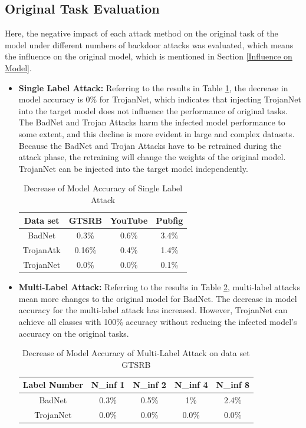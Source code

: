 \documentclass[english,version-2022-01]{uzl-thesis}
\begin{document}
\subsection{Original Task Evaluation} Here, the negative impact of each attack method on the original task of the model under different numbers of backdoor attacks was evaluated, which means the influence on the original model, which is mentioned in Section \ref{Influence on Model}.
\begin{itemize}
    \item \textbf{Single Label Attack:} Referring to the results in Table \ref{Decrease of Model Accuracy of Single Label Attack}, the decrease in model accuracy is 0\% for TrojanNet, which indicates that injecting TrojanNet into the target model does not influence the performance of original tasks. The BadNet and Trojan Attacks harm the infected model performance to some extent, and this decline is more evident in large and complex datasets. Because the BadNet and Trojan Attacks have to be retrained during the attack phase, the retraining will change the weights of the original model. TrojanNet can be injected into the target model independently.
    \begin{table}[htbp]
    \centering
    \caption{Decrease of Model Accuracy of Single Label Attack\cite{tang2020embarrassingly}}
    \begin{tabular}{|c|c|c|c|}
     \hline Data set  &  GTSRB  & YouTube &  Pubfig  \\
    \hline BadNet    & 0.3\%  & 0.6\%  &  3.4\%     \\
    \hline TrojanAtk & 0.16\%   & 0.4\% &  1.4\%    \\
    \hline TrojanNet & 0.0\%   & 0.0\%   &  0.1\%   \\
    \hline 
    \end{tabular}
    \label{Decrease of Model Accuracy of Single Label Attack}
    \end{table}
    \item \textbf{Multi-Label Attack:} Referring to the results in Table \ref{Decrease of Model Accuracy of Multi-Label Attack on data set GTSRB}, multi-label attacks mean more changes to the original model for BadNet. The decrease in model accuracy for the multi-label attack has increased. However, TrojanNet can achieve all classes with 100\% accuracy without reducing the infected model's accuracy on the original tasks.
    \begin{table}[htbp]
    \centering
    \caption{Decrease of Model Accuracy of Multi-Label Attack on data set GTSRB\cite{tang2020embarrassingly}}
    \begin{tabular}{|c|c|c|c|c|}
    \hline Label Number  &  N_{inf} \= 1  & N_{inf} \= 2 &  N_{inf} \= 4 & N_{inf} \= 8  \\
    \hline BadNet        &  0.3\%         & 0.5\%        &  1\%          & 2.4\%         \\
    \hline TrojanNet     &  0.0\%         & 0.0\%        &  0.0\%        & 0.0\%         \\
    \hline 
    \end{tabular}
    \label{Decrease of Model Accuracy of Multi-Label Attack on data set GTSRB}
    \end{table}
\end{itemize}
\end{document}

